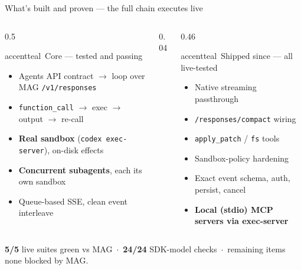 \begin{frame}{What's built and proven --- the full chain executes live}
  \begin{columns}[t, totalwidth=\textwidth]
    \begin{column}{0.5\textwidth}
      \begin{featbox}{accentteal}{\faCheckDouble\ Core --- tested and passing}
        \small
        \begin{itemize}
          \item[\faCheck] Agents API contract $\rightarrow$ loop over MAG \texttt{/v1/responses}
          \item[\faCheck] \texttt{function\_call} $\rightarrow$ exec $\rightarrow$ output $\rightarrow$ re-call
          \item[\faCheck] \textbf{Real sandbox} (\texttt{codex exec-server}), on-disk effects
          \item[\faCheck] \textbf{Concurrent subagents}, each its own sandbox
          \item[\faCheck] Queue-based SSE, clean event interleave
        \end{itemize}
      \end{featbox}
    \end{column}
    \begin{column}{0.04\textwidth}\end{column}
    \begin{column}{0.46\textwidth}
      \begin{featbox}{accentteal}{\faCheckDouble\ Shipped since --- all live-tested}
        \small
        \begin{itemize}
          \item[\faCheck] Native streaming passthrough
          \item[\faCheck] \texttt{/responses/compact} wiring
          \item[\faCheck] \texttt{apply\_patch} / \texttt{fs} tools
          \item[\faCheck] Sandbox-policy hardening
          \item[\faCheck] Exact event schema, auth, persist, cancel
          \item[\faCheck] \textbf{Local (stdio) MCP servers via exec-server}
        \end{itemize}
      \end{featbox}
    \end{column}
  \end{columns}
  \vspace{2pt}
  \begin{center}
    {\footnotesize\color{midgray}\textbf{5/5} live suites green vs MAG \,$\cdot$\, \textbf{24/24} SDK-model checks \,$\cdot$\, remaining items none blocked by MAG.}
  \end{center}
\end{frame}

